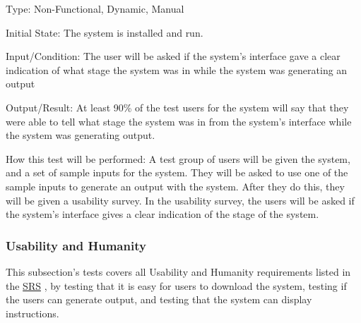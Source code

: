 \documentclass[12pt, titlepage]{article}
\begin{document}
\begin{enumerate}
Type: Non-Functional, Dynamic, Manual
					
Initial State: 
The system is installed and run.		

Input/Condition: 
The user will be asked if the system's interface gave a clear indication of what stage the system was in while the system was generating an output

Output/Result: 
At least 90\% of the test users for the system will say that they were able to tell what stage the system was in from the system's interface while the system was generating output.
					
How this test will be performed:
A test group of users will be given the system, and a set of sample inputs for the system. They will be asked to use one of the sample inputs to generate an output with the system. After they do this, they will be given a usability survey. In the usability survey, the users will be asked if the system's interface gives a clear indication of the stage of the system.

\end{enumerate}

\subsubsection{Usability and Humanity}
This subsection's tests covers all Usability and Humanity requirements listed in the \href{https://github.com/paezha/PyERT-BLACK/blob/main/docs/SRS/SRS.pdf}{SRS} \citep{SRS}, by testing that it is easy for users to download the system, testing if the users can generate output, and testing that the system can display instructions. 
\end{document}

